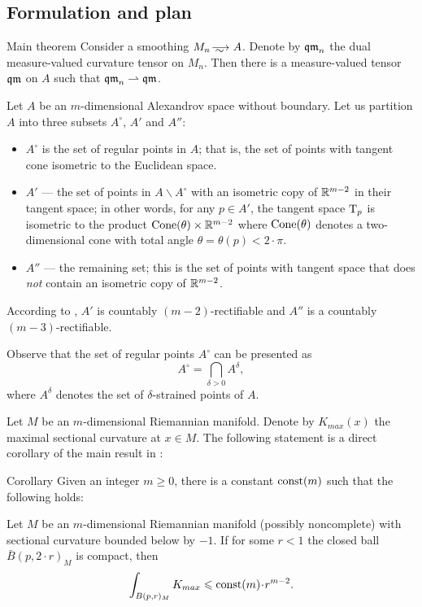 \subsection{Formulation and plan}
  
\begin{thm}{Main theorem}\label{main}
Consider a smoothing $M_n\smooths{} A$.
Denote by $\operatorname{\mathfrak{qm}}_n$ the dual measure-valued curvature tensor on $M_n$.
Then there is a measure-valued tensor $\operatorname{\mathfrak{qm}}$ on $A$ such that $\operatorname{\mathfrak{qm}}_n\rightharpoonup \operatorname{\mathfrak{qm}}$.
\end{thm}

Let $A$ be an $m$-dimensional Alexandrov space without boundary. 
Let us partition $A$ into three subsets $A^\circ$, $A'$ and $A''$:
\begin{itemize}
\item $A^\circ$ is the set of regular points in $A$; that is, the set of points with tangent cone isometric to the Euclidean space.
\item $A'$ --- the set of points in $A\backslash A^\circ$ with an isometric copy of $\mathbb{R}^{m-2}$ in their tangent space;
in other words, for any $p\in A'$, the tangent space $\mathrm{T}_p$ is isometric to the product $\operatorname{Cone}(\theta)\times\mathbb{R}^{m-2}$ where $\operatorname{Cone}(\theta)$ denotes a two-dimensional cone with total angle $\theta=\theta(p)<2\cdot \pi$.
\item $A''$ --- the remaining set; this is the set of points with tangent space that does \emph{not} contain an isometric copy of $\mathbb{R}^{m-2}$.
\end{itemize}
According to \cite{li-naber}, $A'$ is countably $(m-2)$-rectifiable and $A''$ is a countably $(m-3)$-rectifiable. 

Observe that the set of regular points $A^\circ$ can be presented as
$$A^{\circ}=\bigcap_{\delta>0} A^\delta,$$
where $A^\delta$ denotes the set of $\delta$-strained points of $A$.

Let $M$ be an $m$-dimensional Riemannian manifold.
Denote by $K_{max}(x)$ the maximal sectional curvature at $x\in M$.
The following statement is a direct corollary of the main result in \cite{petrunin-SC}:

\begin{thm}{Corollary}\label{cor:Kmax}
Given an integer $m\ge 0$, there is a constant $\mathrm{const}(m)$ such that the following holds:

Let $M$ be an $m$-dimensional Riemannian manifold 
(possibly noncomplete)
with sectional curvature bounded below by $-1$.
If for some $r<1$ the closed ball $\bar B(p,2\cdot r)_M$ is compact,
then 
$$\int_{B(p,r)_M} K_{max}\le \const(m)\cdot r^{m-2}.$$

\end{thm}

